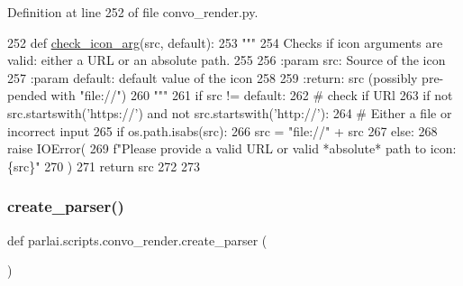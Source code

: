 Definition at line 252 of file convo\+\_\+render.\+py.


\begin{DoxyCode}
252 \textcolor{keyword}{def }\hyperlink{namespaceparlai_1_1scripts_1_1convo__render_ac7e3c84a7f6e3b488360319b597eda18}{check\_icon\_arg}(src, default):
253     \textcolor{stringliteral}{"""}
254 \textcolor{stringliteral}{    Checks if icon arguments are valid: either a URL or an absolute path.}
255 \textcolor{stringliteral}{}
256 \textcolor{stringliteral}{    :param src: Source of the icon}
257 \textcolor{stringliteral}{    :param default: default value of the icon}
258 \textcolor{stringliteral}{}
259 \textcolor{stringliteral}{    :return: src (possibly pre-pended with "file://")}
260 \textcolor{stringliteral}{    """}
261     \textcolor{keywordflow}{if} src != default:
262         \textcolor{comment}{# check if URl}
263         \textcolor{keywordflow}{if} \textcolor{keywordflow}{not} src.startswith(\textcolor{stringliteral}{'https://'}) \textcolor{keywordflow}{and} \textcolor{keywordflow}{not} src.startswith(\textcolor{stringliteral}{'http://'}):
264             \textcolor{comment}{# Either a file or incorrect input}
265             \textcolor{keywordflow}{if} os.path.isabs(src):
266                 src = \textcolor{stringliteral}{"file://"} + src
267             \textcolor{keywordflow}{else}:
268                 \textcolor{keywordflow}{raise} IOError(
269                     f\textcolor{stringliteral}{"Please provide a valid URL or valid *absolute* path to icon: \{src\}"}
270                 )
271     \textcolor{keywordflow}{return} src
272 
273 
\end{DoxyCode}
\mbox{\label{namespaceparlai_1_1scripts_1_1convo__render_a4220e40f3e0c5ac320177b6e0f3d8e83}} 
\subsubsection{\texorpdfstring{create\+\_\+parser()}{create\_parser()}}
{\footnotesize\ttfamily def parlai.\+scripts.\+convo\+\_\+render.\+create\+\_\+parser (\begin{DoxyParamCaption}{ }\end{DoxyParamCaption})}

